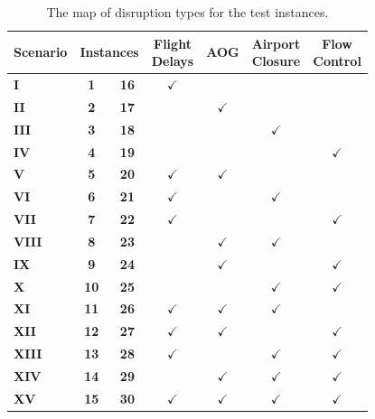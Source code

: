 \begin{table}[H]
\centering
  \caption{The map of disruption types for the test instances.}
  \SupplementTableSetup
\begin{tabular*}{\linewidth}{@{\extracolsep{\fill}}lcccccc@{}}
	\toprule
    \textbf{Scenario} & \multicolumn{2}{c}{\textbf{Instances}} & \shortstack{\textbf{Flight}\\\textbf{Delays}} & \textbf{AOG} & \shortstack{\textbf{Airport}\\\textbf{Closure}} & \shortstack{\textbf{Flow}\\\textbf{Control}} \\
	\midrule 
    \textbf{I}    & \textbf{1}    & \textbf{16}    & $\checkmark$     &       &       &  \\
    \textbf{II}     & \textbf{2}    & \textbf{17}    &       & $\checkmark$     &       &  \\
    \textbf{III}     & \textbf{3}    & \textbf{18}    &       &       & $\checkmark$     &  \\
    \textbf{IV}     & \textbf{4}    & \textbf{19}    &       &       &       & $\checkmark$ \\
    \textbf{V}     & \textbf{5}    & \textbf{20}    & $\checkmark$     & $\checkmark$     &       &  \\
    \textbf{VI}     & \textbf{6}    & \textbf{21}    & $\checkmark$     &       & $\checkmark$     &  \\
    \textbf{VII}     & \textbf{7}    & \textbf{22}    & $\checkmark$     &       &       & $\checkmark$ \\
    \textbf{VIII}     & \textbf{8}    & \textbf{23}    &       & $\checkmark$     & $\checkmark$     &  \\
    \textbf{IX}     & \textbf{9}    & \textbf{24}    &       & $\checkmark$     &       & $\checkmark$ \\
    \textbf{X}    & \textbf{10}    & \textbf{25}    &       &       & $\checkmark$     & $\checkmark$ \\
    \textbf{XI}    & \textbf{11}    & \textbf{26}    & $\checkmark$     & $\checkmark$     & $\checkmark$     &  \\
    \textbf{XII}    & \textbf{12}    & \textbf{27}    & $\checkmark$     & $\checkmark$     &       & $\checkmark$ \\
    \textbf{XIII}    & \textbf{13}    & \textbf{28}    & $\checkmark$     &       & $\checkmark$     & $\checkmark$ \\
    \textbf{XIV}    & \textbf{14}    & \textbf{29}    &       & $\checkmark$     & $\checkmark$     & $\checkmark$ \\
    \textbf{XV}    & \textbf{15}    & \textbf{30}    & $\checkmark$     & $\checkmark$     & $\checkmark$     & $\checkmark$ \\
	\bottomrule
    \end{tabular*}
  \label{table:disruption_map}%
\end{table}
